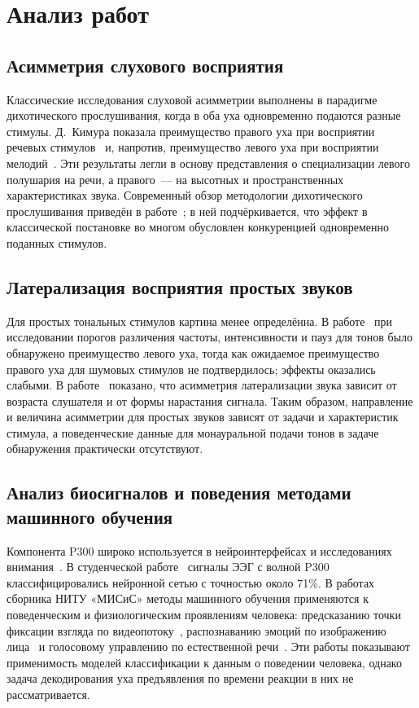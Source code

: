 \documentclass{misisarticle}
\begin{document}
\section{Анализ работ}

\subsection{Асимметрия слухового восприятия}

Классические исследования слуховой асимметрии выполнены в парадигме дихотического прослушивания, когда в оба уха одновременно подаются разные стимулы. Д.~Кимура показала преимущество правого уха при восприятии речевых стимулов~\cite{kimura1961} и, напротив, преимущество левого уха при восприятии мелодий~\cite{kimura1964}. Эти результаты легли в основу представления о специализации левого полушария на речи, а правого~--- на высотных и пространственных характеристиках звука. Современный обзор методологии дихотического прослушивания приведён в работе~\cite{westerhausen2019}; в ней подчёркивается, что эффект в классической постановке во многом обусловлен конкуренцией одновременно поданных стимулов.

\subsection{Латерализация восприятия простых звуков}

Для простых тональных стимулов картина менее определённа. В работе~\cite{sininger2012} при исследовании порогов различения частоты, интенсивности и пауз для тонов было обнаружено преимущество левого уха, тогда как ожидаемое преимущество правого уха для шумовых стимулов не подтвердилось; эффекты оказались слабыми. В работе~\cite{morita2023} показано, что асимметрия латерализации звука зависит от возраста слушателя и от формы нарастания сигнала. Таким образом, направление и величина асимметрии для простых звуков зависят от задачи и характеристик стимула, а поведенческие данные для монауральной подачи тонов в задаче обнаружения практически отсутствуют.

\subsection{Анализ биосигналов и поведения методами машинного обучения}

Компонента P300 широко используется в нейроинтерфейсах и исследованиях внимания~\cite{polich2007}. В студенческой работе~\cite{zhuravlev2022} сигналы ЭЭГ с волной P300 классифицировались нейронной сетью с точностью около 71\%. В работах сборника НИТУ «МИСиС» методы машинного обучения применяются к поведенческим и физиологическим проявлениям человека: предсказанию точки фиксации взгляда по видеопотоку~\cite{zhuravleva2026}, распознаванию эмоций по изображению лица~\cite{honer2024} и голосовому управлению по естественной речи~\cite{saveliev2025}. Эти работы показывают применимость моделей классификации к данным о поведении человека, однако задача декодирования уха предъявления по времени реакции в них не рассматривается.
\end{document}
